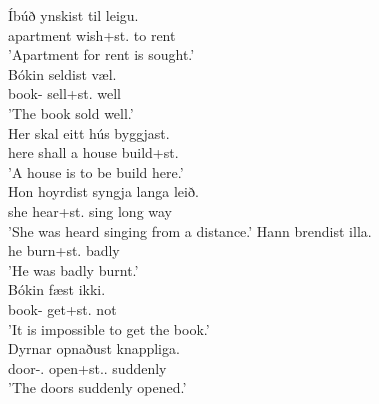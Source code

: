 \documentclass[12pt,%
]{lin-v2/lin}
\begin{document}
\begin{exe}
    \ex\label{middles}
    \begin{xlist}
        \ex\label{middles1} \gll Íbúð ynskist til leigu.\\
        apartment wish+st.\Prs{} to rent\\
        \trans 'Apartment for rent is sought.'\\
        \ex\label{middles2} \gll Bókin seldist væl.\\
        book-\Def{} sell+st.\Pst{} well\\
        \trans 'The book sold well.'\\
        \ex\label{middles3} \gll Her skal eitt hús byggjast.\\
        here shall a house build+st.\Prs{}\\
        \trans 'A house is to be build here.'\\
        \ex\label{middles4} \gll Hon hoyrdist syngja langa leið.\\
        she {hear}+st.\Pst{} sing long way\\
        \trans 'She was heard singing from a distance.'
        \ex\label{middles5} \gll Hann brendist illa.\\
        he burn+st.\Pst{} badly\\
        \trans 'He was badly burnt.'\\
        \ex\label{middles6} \gll Bókin fæst ikki.\\
        book-\Def{} get+st.\Prs{} not\\
        \trans 'It is impossible to get the book.'\\
        \ex\label{middles7} \gll Dyrnar opnaðust knappliga.\\
        door-\Def.\Pl{} open+st.\Pl.\Pst{} suddenly\\
        \trans 'The doors suddenly opened.'\\
    \end{xlist}
\end{exe}
\end{document}
